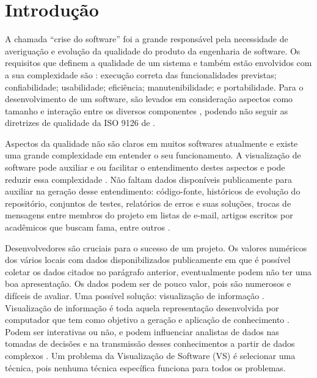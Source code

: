 \chapter{Introdução}


A chamada ``crise do software'' \cite{arthur1985measuring} foi a grande
responsável pela necessidade de averiguação e evolução da qualidade do produto
da engenharia de software. Os requisitos que definem a qualidade de um sistema
e também estão envolvidos com a sua complexidade são
\cite{behkamal2009customizing}: execução correta das funcionalidades previstas;
confiabilidade; usabilidade; eficiência; manutenibilidade; e portabilidade. Para
o desenvolvimento de um software, são levados em consideração aspectos como
tamanho e interação entre os diversos componentes \cite{koscianski2007qualidade},
podendo não seguir as diretrizes de qualidade da ISO 9126 de
.

Aspectos da qualidade não são claros em muitos softwares atualmente e existe
uma grande complexidade em entender o seu funcionamento. A visualização de
software pode auxiliar e ou facilitar o entendimento destes aspectos e pode
reduzir essa complexidade \cite{messias2012} \cite{benkler2006wealth}. Não
faltam dados disponíveis publicamente para auxiliar na geração desse
entendimento: código-fonte, históricos de evolução do repositório, conjuntos de
testes, relatórios de erros e suas soluções, trocas de mensagens entre membros
do projeto em listas de e-mail, artigos escritos por acadêmicos que buscam fama,
entre outros \cite{messias2012} \cite{benkler2006wealth}.

Desenvolvedores são cruciais para o sucesso de um projeto. Os valores
numéricos dos vários locais com dados disponibilizados publicamente em que é
possível coletar os dados citados no parágrafo anterior, eventualmente podem não
ter uma boa apresentação. Os dados podem ser de pouco valor, pois são numerosos
e difíceis de avaliar. Uma possível solução: visualização de informação
\cite{messias2012}. Visualização de informação é toda aquela representação
desenvolvida por computador que tem como objetivo a geração e aplicação de
conhecimento \cite{card1999readings}. Podem ser interativas ou não, e podem
influenciar analistas de dados nas tomadas de decisões e na transmissão desses
conhecimentos a partir de dados complexos \cite{card1999readings}. Um problema
da Visualização de Software (VS) é selecionar uma técnica, pois nenhuma técnica
específica funciona para todos os problemas.

